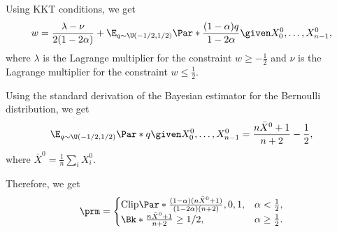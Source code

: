 \documentclass{article}
\begin{document}
Using KKT conditions, we get
\[
    w = \frac{\lambda - \nu}{2 (1 - 2 \alpha)} + \E_{q \sim \U(-1/2,
    1/2)}\Par*{\frac{(1 - \alpha) q}{1 - 2 \alpha} \given X^0_0, \dots,
    X^0_{n-1}},
\]
where $\lambda$ is the Lagrange multiplier for the constraint $w \ge
-\frac{1}{2}$ and $\nu$ is the Lagrange multiplier for the constraint $w \le
\frac{1}{2}$.

Using the standard derivation of the Bayesian estimator for the Bernoulli
distribution, we get
\[
    \E_{q \sim \U(-1/2, 1/2)}\Par*{q \given X^0_0, \dots, X^0_{n-1}} =
    \frac{n \bar{X}^0 + 1}{n + 2} - \frac{1}{2},
\]
where $\bar{X}^0 = \frac{1}{n} \sum_i X^0_i$.

Therefore, we get
\[
    \prm =
    \begin{cases}
        \mathrm{Clip}\Par*{\frac{(1 - \alpha) (n \bar{X}^0 + 1)}{(1 - 2 \alpha)
        (n + 2)}, 0, 1}, & \alpha <
        \frac{1}{2},\\
        \Bk*{\frac{n \bar{X}^0 + 1}{n + 2} \ge 1 / 2}, & \alpha \ge
        \frac{1}{2}.
    \end{cases}
\]




\end{document}
